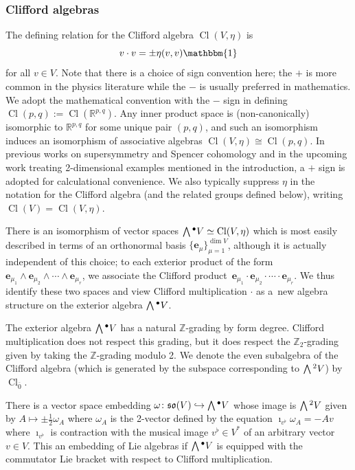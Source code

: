 \documentclass[pdftex]{sigma}
\numberwithin{equation}{section}
\newcommand{\fso}{\mathfrak{so}}
\newcommand{\RR}{\mathbb{R}}
\newcommand{\ZZ}{\mathbb{Z}}
\newcommand{\Wedge}{\mathchoice{{\textstyle\bigwedge}}{\bigwedge}{\bigwedge}{\bigwedge}}	%
\newcommand{\be}{\boldsymbol{e}}
\newcommand{\1}{\mathbbm{1}}
\DeclareMathOperator{\Cl}{Cl}
\begin{document}
\subsubsection{Clifford algebras}
\label{sec:clifford-algs}

The defining relation for the Clifford algebra $\Cl(V,\eta)$ is
\begin{equation}\label{eq:clifford-rel}
	v\cdot v = \pm\eta(v,v)\1
\end{equation}
for all $v\in V$. Note that there is a choice of sign convention here; the $+$ is more common in the physics literature while the $-$ is usually preferred in mathematics. We adopt the mathematical convention with the $-$ sign in defining $\Cl(p,q):=\Cl(\RR^{p,q})$. Any inner product space is (non-canonically) isomorphic to $\RR^{p,q}$ for some unique pair $(p,q)$, and such an isomorphism induces an isomorphism of associative algebras $\Cl(V,\eta)\cong \Cl(p,q)$. In previous works on supersymmetry and Spencer cohomology \cite{Beckett2021,deMedeiros2016,deMedeiros2018,Figueroa-OFarrill2017} and in the upcoming work treating 2-dimensional examples mentioned in the introduction, a $+$ sign is adopted for calculational convenience. We also typically suppress $\eta$ in the notation for the Clifford algebra (and the related groups defined below), writing $\Cl(V)=\Cl(V,\eta)$.

There is an isomorphism of vector spaces $\Wedge^\bullet V\simeq \Cl(V,\eta)$ which is most easily described in terms of an orthonormal basis $\{\be_\mu\}_{\mu=1}^{\dim V}$, although it is actually independent of this choice; to each exterior product of the form $\be_{\mu_1}\wedge\be_{\mu_2}\wedge\cdots\wedge\be_{\mu_r}$, we associate the Clifford product~${\be_{\mu_1}\cdot\be_{\mu_2}\cdot\cdots\cdot\be_{\mu_r}}$. We thus identify these two spaces and view Clifford multiplication $\cdot$ as a~new algebra structure on the exterior algebra $\Wedge^\bullet V$.

The exterior algebra $\Wedge^\bullet V$ has a natural $\ZZ$-grading by form degree. Clifford multiplication does not respect this grading, but it does respect the $\ZZ_2$-grading given by taking the $\ZZ$-grading modulo 2. We denote the even subalgebra of the Clifford algebra \big(which is generated by the subspace corresponding to $\Wedge^2 V$\big) by $\Cl_{\overline0}$.

There is a vector space embedding $\omega\colon\fso(V)\hookrightarrow\Wedge^\bullet V$ whose image is $\Wedge^2 V$ given by $A\mapsto \pm\frac{1}{2}\omega_A$ where $\omega_A$ is the 2-vector defined by the equation
$\imath_{v^\flat}\omega_A = -Av
$
where $\imath_{v^\flat}$ is contraction with the musical image $v^\flat\in V^*$ of an arbitrary vector $v\in V$.
This an embedding of Lie algebras if $\Wedge^\bullet V$ is equipped with the commutator Lie bracket with respect to Clifford multiplication.
\end{document}

